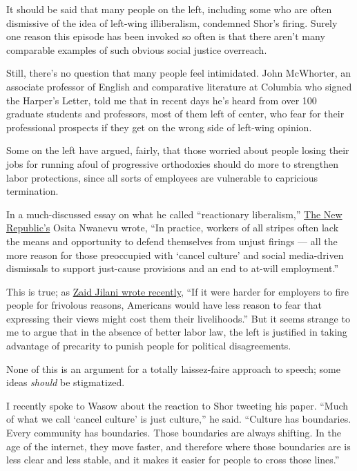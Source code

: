 It should be said that many people on the left, including some who are
often dismissive of the idea of left-wing illiberalism, condemned Shor's
firing. Surely one reason this episode has been invoked so often is that
there aren't many comparable examples of such obvious social justice
overreach.

Still, there's no question that many people feel intimidated. John
McWhorter, an associate professor of English and comparative literature
at Columbia who signed the Harper's Letter, told me that in recent days
he's heard from over 100 graduate students and professors, most of them
left of center, who fear for their professional prospects if they get on
the wrong side of left-wing opinion.

Some on the left have argued, fairly, that those worried about people
losing their jobs for running afoul of progressive orthodoxies should do
more to strengthen labor protections, since all sorts of employees are
vulnerable to capricious termination.

In a much-discussed essay on what he called ``reactionary liberalism,''
\href{https://newrepublic.com/article/158346/willful-blindness-reactionary-liberalism}{The
New Republic's} Osita Nwanevu wrote, ``In practice, workers of all
stripes often lack the means and opportunity to defend themselves from
unjust firings⁠ --- all the more reason for those preoccupied with
`cancel culture' and social media-driven dismissals to support
just-cause provisions and an end to at-will employment.''

This is true; as
\href{https://www.persuasion.community/p/a-better-remedy-for-cancel-culture}{Zaid
Jilani wrote recently}, ``If it were harder for employers to fire people
for frivolous reasons, Americans would have less reason to fear that
expressing their views might cost them their livelihoods.'' But it seems
strange to me to argue that in the absence of better labor law, the left
is justified in taking advantage of precarity to punish people for
political disagreements.

None of this is an argument for a totally laissez-faire approach to
speech; some ideas \emph{should} be stigmatized.

I recently spoke to Wasow about the reaction to Shor tweeting his paper.
``Much of what we call `cancel culture' is just culture,'' he said.
``Culture has boundaries. Every community has boundaries. Those
boundaries are always shifting. In the age of the internet, they move
faster, and therefore where those boundaries are is less clear and less
stable, and it makes it easier for people to cross those lines.''


